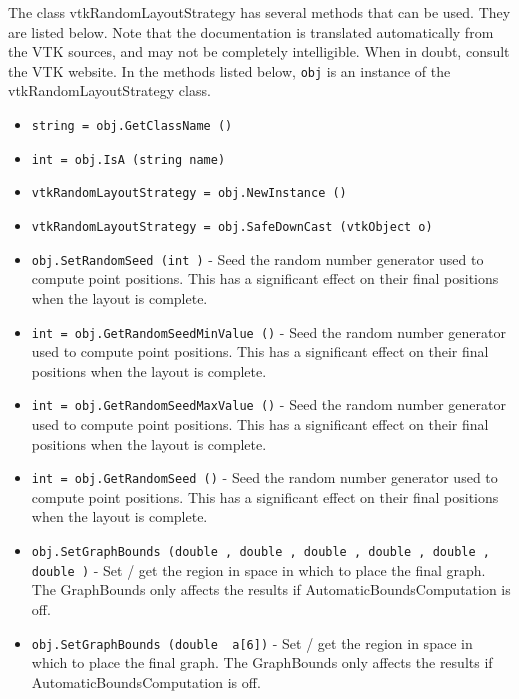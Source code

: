The class vtkRandomLayoutStrategy has several methods that can be used.
  They are listed below.
Note that the documentation is translated automatically from the VTK sources,
and may not be completely intelligible.  When in doubt, consult the VTK website.
In the methods listed below, \verb|obj| is an instance of the vtkRandomLayoutStrategy class.
\begin{itemize}
\item  \verb|string = obj.GetClassName ()|

\item  \verb|int = obj.IsA (string name)|

\item  \verb|vtkRandomLayoutStrategy = obj.NewInstance ()|

\item  \verb|vtkRandomLayoutStrategy = obj.SafeDownCast (vtkObject o)|

\item  \verb|obj.SetRandomSeed (int )| -  Seed the random number generator used to compute point positions.
 This has a significant effect on their final positions when
 the layout is complete.

\item  \verb|int = obj.GetRandomSeedMinValue ()| -  Seed the random number generator used to compute point positions.
 This has a significant effect on their final positions when
 the layout is complete.

\item  \verb|int = obj.GetRandomSeedMaxValue ()| -  Seed the random number generator used to compute point positions.
 This has a significant effect on their final positions when
 the layout is complete.

\item  \verb|int = obj.GetRandomSeed ()| -  Seed the random number generator used to compute point positions.
 This has a significant effect on their final positions when
 the layout is complete.

\item  \verb|obj.SetGraphBounds (double , double , double , double , double , double )| -  Set / get the region in space in which to place the final graph.
 The GraphBounds only affects the results if AutomaticBoundsComputation
 is off.

\item  \verb|obj.SetGraphBounds (double  a[6])| -  Set / get the region in space in which to place the final graph.
 The GraphBounds only affects the results if AutomaticBoundsComputation
 is off.


\end{itemize}

